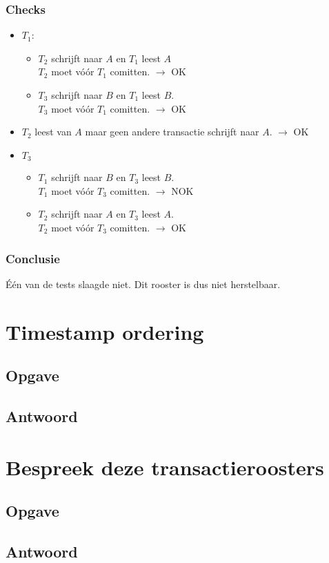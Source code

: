 \documentclass[transacties.tex]{subfiles}
\begin{document}
\subsubsection*{Checks}
\begin{itemize}
\item $T_1$:
\begin{itemize}
\item $T_2$ schrijft naar $A$ en $T_1$ leest $A$\\
$T_2$ moet v\'o\'or $T_1$ comitten. $\rightarrow$ OK
\item $T_3$ schrijft naar $B$ en $T_1$ leest $B$.\\
$T_3$ moet v\'o\'or $T_1$ comitten. $\rightarrow$ OK
\end{itemize}

\item $T_2$ leest van $A$ maar geen andere transactie schrijft naar $A$. $\rightarrow$ OK

\item $T_3$
\begin{itemize}
\item $T_1$ schrijft naar $B$ en $T_3$ leest $B$.\\
$T_1$ moet v\'o\'or $T_3$ comitten. $\rightarrow$ NOK
\item $T_2$ schrijft naar $A$ en $T_3$ leest $A$.\\
$T_2$ moet v\'o\'or $T_3$ comitten. $\rightarrow$ OK
\end{itemize}
\end{itemize}
\subsubsection*{Conclusie}
\'E\'en van de tests slaagde niet. Dit rooster is dus niet herstelbaar.


\section{Timestamp ordering}
\subsection*{Opgave}

\subsection*{Antwoord}

\section{Bespreek deze transactieroosters}
\subsection*{Opgave}

\subsection*{Antwoord}
\end{document}
